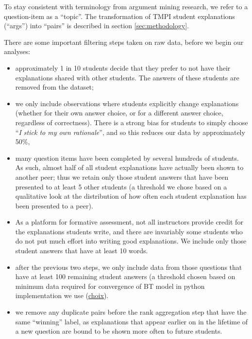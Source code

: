 \documentclass[notitlepage,12pt]{jedm}
\begin{document}
To stay consistent with terminology from argument mining research, we 
refer to a question-item as a ``topic''.
The transformation of TMPI student explanations (``args'') into ``pairs'' is 
described in section \ref{sec:methodology}. 

There are some important filtering steps taken on raw data, before we begin our 
analyses:
\begin{itemize}
	\item approximately 1 in 10 students decide that they prefer to not have  
	their explanations shared with other students.
	The answers of these students are removed from the dataset; 
	\item we only include observations where students explicitly 
	change explanations (whether for their own answer choice, or for a 
	different answer choice, regardless of correctness). 
	There is a strong bias for students to simply choose ``\textit{I stick to 
	my 
	own rationale}'', and so this reduces our data by approximately 50\%,
	\item many question items have been completed by several hundreds of 
	students.
	As such, almost half of all student explanations have actually been shown 
	to another peer; thus we retain only those student answers that have been 
	presented to at least 5 other students (a threshold we chose based on a 
	qualitative look at the distribution of how often each student explanation 
	has been presented to a peer).
	\item As a platform for formative assessment, not all instructors provide 
	credit for the explanations students write, and there are invariably some 
	students who do not put much effort into writing good explanations.
	We include only those student answers that have at least 10 words.
	\item after the previous two steps, we only include data from those 
	questions that have at least 100 remaining student answers (a threshold 
	chosen based on minimum data required for convergence of BT model in python 
	implementation we use ({\href{http://choix.lum.li/en/latest/}{choix}}).
	\item we remove any duplicate pairs before the rank aggregation step that 
	have the same ``winning'' label, as explanations that appear earlier on in 
	the lifetime of a new question are bound to be shown more often to future 
	students.
\end{itemize}
\end{document}
